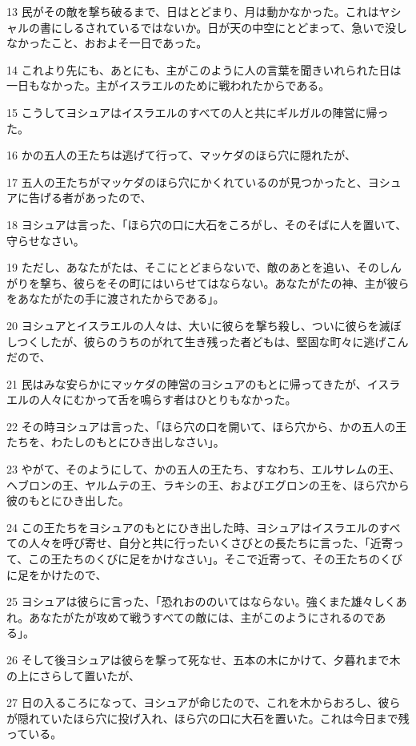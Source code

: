 \par 13 民がその敵を撃ち破るまで、日はとどまり、月は動かなかった。これはヤシャルの書にしるされているではないか。日が天の中空にとどまって、急いで没しなかったこと、おおよそ一日であった。
\par 14 これより先にも、あとにも、主がこのように人の言葉を聞きいれられた日は一日もなかった。主がイスラエルのために戦われたからである。
\par 15 こうしてヨシュアはイスラエルのすべての人と共にギルガルの陣営に帰った。
\par 16 かの五人の王たちは逃げて行って、マッケダのほら穴に隠れたが、
\par 17 五人の王たちがマッケダのほら穴にかくれているのが見つかったと、ヨシュアに告げる者があったので、
\par 18 ヨシュアは言った、「ほら穴の口に大石をころがし、そのそばに人を置いて、守らせなさい。
\par 19 ただし、あなたがたは、そこにとどまらないで、敵のあとを追い、そのしんがりを撃ち、彼らをその町にはいらせてはならない。あなたがたの神、主が彼らをあなたがたの手に渡されたからである」。
\par 20 ヨシュアとイスラエルの人々は、大いに彼らを撃ち殺し、ついに彼らを滅ぼしつくしたが、彼らのうちのがれて生き残った者どもは、堅固な町々に逃げこんだので、
\par 21 民はみな安らかにマッケダの陣営のヨシュアのもとに帰ってきたが、イスラエルの人々にむかって舌を鳴らす者はひとりもなかった。
\par 22 その時ヨシュアは言った、「ほら穴の口を開いて、ほら穴から、かの五人の王たちを、わたしのもとにひき出しなさい」。
\par 23 やがて、そのようにして、かの五人の王たち、すなわち、エルサレムの王、ヘブロンの王、ヤルムテの王、ラキシの王、およびエグロンの王を、ほら穴から彼のもとにひき出した。
\par 24 この王たちをヨシュアのもとにひき出した時、ヨシュアはイスラエルのすべての人々を呼び寄せ、自分と共に行ったいくさびとの長たちに言った、「近寄って、この王たちのくびに足をかけなさい」。そこで近寄って、その王たちのくびに足をかけたので、
\par 25 ヨシュアは彼らに言った、「恐れおののいてはならない。強くまた雄々しくあれ。あなたがたが攻めて戦うすべての敵には、主がこのようにされるのである」。
\par 26 そして後ヨシュアは彼らを撃って死なせ、五本の木にかけて、夕暮れまで木の上にさらして置いたが、
\par 27 日の入るころになって、ヨシュアが命じたので、これを木からおろし、彼らが隠れていたほら穴に投げ入れ、ほら穴の口に大石を置いた。これは今日まで残っている。
